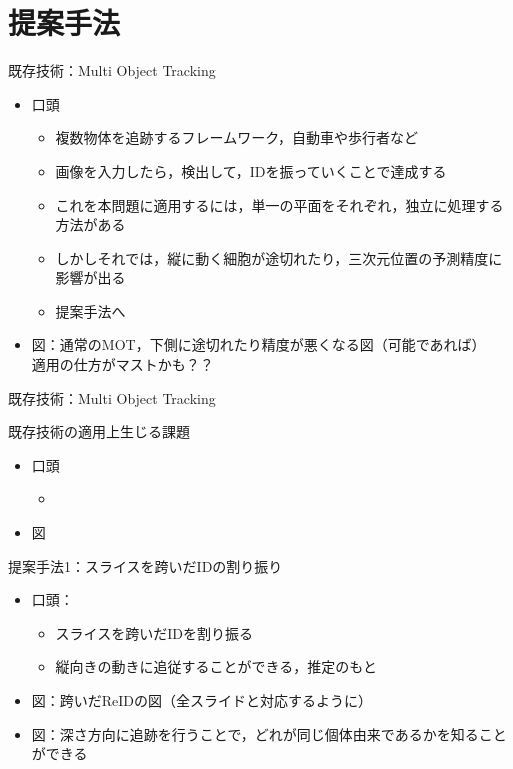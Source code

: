 \section{提案手法}

\begin{frame}[noframenumbering]{既存技術：Multi Object Tracking}
    \begin{itemize}
        \item 口頭
        \begin{itemize}
            \item 複数物体を追跡するフレームワーク，自動車や歩行者など
            \item 画像を入力したら，検出して，IDを振っていくことで達成する
            \item これを本問題に適用するには，単一の平面をそれぞれ，独立に処理する方法がある
            \item しかしそれでは，縦に動く細胞が途切れたり，三次元位置の予測精度に影響が出る
            \item 提案手法へ
        \end{itemize}
        \item 図：通常のMOT，下側に途切れたり精度が悪くなる図（可能であれば）
        \\\ra 適用の仕方がマストかも？？
    \end{itemize}
\end{frame}
\begin{frame}{既存技術：Multi Object Tracking}
\end{frame}

\begin{frame}[noframenumbering]{既存技術の適用上生じる課題}
    \begin{itemize}
        \item 口頭
        \begin{itemize}
            \item 
        \end{itemize}
        \item 図
    \end{itemize}
\end{frame}


\begin{frame}[noframenumbering]{提案手法1：スライスを跨いだIDの割り振り}
    \begin{itemize}
        \item 口頭：
        \begin{itemize}
            \item スライスを跨いだIDを割り振る
            \item 縦向きの動きに追従することができる，推定のもと
        \end{itemize}
        \item 図：跨いだReIDの図（全スライドと対応するように）
        \item 図：深さ方向に追跡を行うことで，どれが同じ個体由来であるかを知ることができる
    \end{itemize}
\end{frame}

